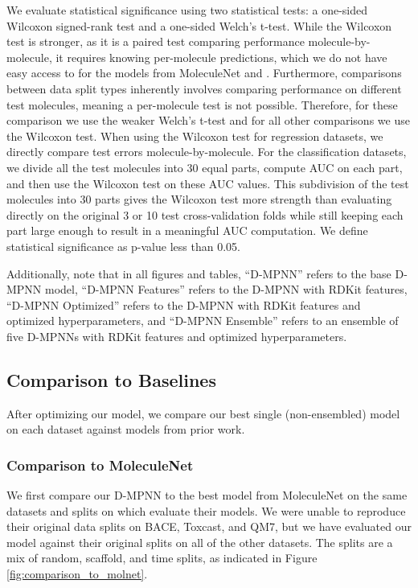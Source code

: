\documentclass[journal=jcisd8,manuscript=article]{achemso}
\begin{document}
We evaluate statistical significance using two statistical tests: a one-sided Wilcoxon signed-rank test and a one-sided Welch's t-test. While the Wilcoxon test is stronger, as it is a paired test comparing performance molecule-by-molecule, it requires knowing per-molecule predictions, which we do not have easy access to for the models from MoleculeNet\cite{Wu_2018} and \citeauthor{mayr2018chembl}\cite{mayr2018chembl}. Furthermore, comparisons between data split types inherently involves comparing performance on different test molecules, meaning a per-molecule test is not possible. Therefore, for these comparison we use the weaker Welch's t-test and for all other comparisons we use the Wilcoxon test. When using the Wilcoxon test for regression datasets, we directly compare test errors molecule-by-molecule. For the classification datasets, we divide all the test molecules into 30 equal parts, compute AUC on each part, and then use the Wilcoxon test on these AUC values. This subdivision of the test molecules into 30 parts gives the Wilcoxon test more strength than evaluating directly on the original 3 or 10 test cross-validation folds while still keeping each part large enough to result in a meaningful AUC computation. We define statistical significance as p-value less than 0.05.

Additionally, note that in all figures and tables, ``D-MPNN'' refers to the base D-MPNN model, ``D-MPNN Features'' refers to the D-MPNN with RDKit features, ``D-MPNN Optimized'' refers to the D-MPNN with RDKit features and optimized hyperparameters, and ``D-MPNN Ensemble'' refers to an ensemble of five D-MPNNs with RDKit features and optimized hyperparameters.


\subsection{Comparison to Baselines}

After optimizing our model, we compare our best single (non-ensembled) model on each dataset against models from prior work.

\subsubsection{Comparison to MoleculeNet}

We first compare our D-MPNN to the best model from MoleculeNet\cite{Wu_2018,Ramsundar-et-al-2019} on the same datasets and splits on which \citeauthor{Wu_2018}\cite{Wu_2018} evaluate their models. We were unable to reproduce their original data splits on BACE, Toxcast, and QM7, but we have evaluated our model against their original splits on all of the other datasets. The splits are a mix of random, scaffold, and time splits, as indicated in Figure \ref{fig:comparison_to_molnet}.
\end{document}
